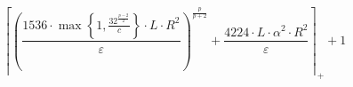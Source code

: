 \[\left\lceil \left(\frac{1536 \cdot \max\left\{ 1, \frac{32^{\frac{p - 2}{2}}}{c} \right\} \cdot L \cdot R^{2}}{\varepsilon}\right)^{\frac{p}{p + 2}} + \frac{4224 \cdot L \cdot \alpha^{2} \cdot R^{2}}{\varepsilon} \right\rceil_{+} + 1\]
